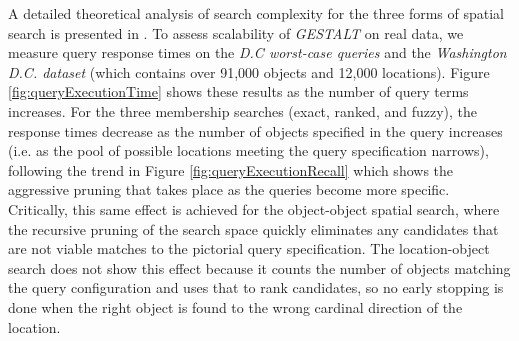 A detailed theoretical analysis of search complexity for the three forms of spatial search is presented in .
To assess scalability of \emph{GESTALT} on real data, we measure query response times on the \textit{D.C worst-case queries} and the \textit{Washington D.C. dataset} (which contains over 91,000 objects and 12,000 locations).
Figure \ref{fig:queryExecutionTime} shows these results as the number of query terms increases. 
For the three membership searches (exact, ranked, and fuzzy), the response times decrease as the number of objects specified in the query increases (i.e. as the pool of possible locations meeting the query specification narrows), following the trend in Figure \ref{fig:queryExecutionRecall} which shows the aggressive pruning that takes place as the queries become more specific.
 Critically, this same effect is achieved for the object-object spatial search, where the recursive pruning of the search space quickly eliminates any candidates that are not viable matches to the pictorial query specification.
The location-object search does not show this effect because it counts the number of objects matching the query configuration and uses that to rank candidates, so no early stopping is done when the right object is found to the wrong cardinal direction of the location. %









